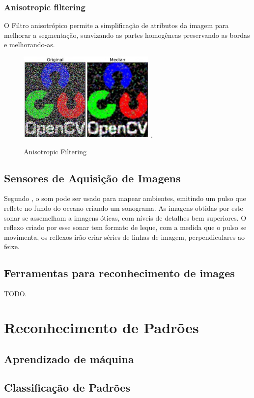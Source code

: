     \[
    \]
    

\subsubsection{Anisotropic filtering}
O Filtro anisotrópico permite a simplificação de atributos da imagem para melhorar a segmentação,  suavizando as partes homogêneas preservando as bordas e melhorando-as.

 \begin{figure}[H]
	\centering
    	\caption{\label{fig:anisifilter}Anisotropic Filtering}
		\includegraphics[width = 0.6\textwidth]	{resources/anisifilter}
    	.
\end{figure}

\subsection{Sensores de Aquisição de Imagens}
Segundo , o som pode ser usado para mapear ambientes, emitindo um pulso que reflete no fundo do oceano criando um sonograma. As imagens obtidas por este sonar se assemelham a imagens óticas, com níveis de detalhes bem superiores. O reflexo criado por esse sonar tem formato de leque, com a medida que o pulso se movimenta, os reflexos irão criar séries de linhas de imagem, perpendiculares ao feixe.  

\subsection{Ferramentas para reconhecimento de images}
TODO.


\section{Reconhecimento de Padrões}


\subsection{Aprendizado de máquina} 


\subsection{Classificação de Padrões}




    
